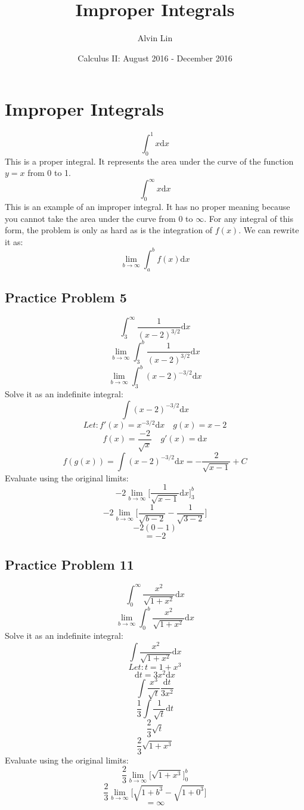 \documentclass[letterpaper, 12pt]{article}
\title{Improper Integrals}
\author{Alvin Lin}
\date{Calculus II: August 2016 - December 2016}
\newcommand*{\diff}{\mathrm{d}}
\begin{document}
\maketitle

\section*{Improper Integrals}
\[ \int_{0}^{1}x\diff{x} \]
This is a proper integral. It represents the area under the curve of the
function \( y=x \) from 0 to 1.
\[ \int_{0}^{\infty}{x\diff{x}} \]
This is an example of an improper integral. It has no proper meaning because
you cannot take the area under the curve from 0 to \(\infty\). For any integral
of this form, the problem is only as hard as is the integration of \(f(x)\). We
can rewrite it as:
\[ \lim_{b \to \infty}\int_{a}^{b}{f(x)\diff{x}} \]

\subsection*{Practice Problem 5}
\[ \int_{3}^{\infty}{\frac{1}{(x-2)^{3/2}}\diff{x}} \]
\[ \lim_{b \to \infty}\int_{3}^{b}{\frac{1}{(x-2)^{3/2}}\diff{x}} \]
\[ \lim_{b \to \infty}\int_{3}^{b}{(x-2)^{-3/2}\diff{x}} \]
Solve it as an indefinite integral:
\[ \int{(x-2)^{-3/2}\diff{x}} \]
\[ Let: f'(x) = x^{-3/2}\diff{x} \quad g(x) = x-2 \]
\[ f(x) = \frac{-2}{\sqrt{x}} \quad g'(x) = \diff{x} \]
\[ f(g(x)) = \int{(x-2)^{-3/2}\diff{x}} = -\frac{2}{\sqrt{x-1}}+C \]
Evaluate using the original limits:
\[ -2\lim_{b \to \infty}\bigg[\frac{1}{\sqrt{x-1}}\diff{x}\bigg]_{3}^{b} \]
\[ -2\lim_{b \to \infty}
   \bigg[\frac{1}{\sqrt{b-2}}-\frac{1}{\sqrt{3-2}}\bigg] \]
\[ -2(0-1) \]
\[ = -2 \]

\subsection*{Practice Problem 11}
\[ \int_{0}^{\infty}{\frac{x^{2}}{\sqrt{1+x^{2}}}\diff{x}} \]
\[ \lim_{b \to \infty}\int_{0}^{b}{\frac{x^{2}}{\sqrt{1+x^{2}}}\diff{x}} \]
Solve it as an indefinite integral:
\[ \int{\frac{x^{2}}{\sqrt{1+x^{2}}}\diff{x}} \]
\[ Let: t = 1+x^{3} \]
\[ \diff{t} = 3x^{2}\diff{x} \]
\[ \int{\frac{x^{3}}{\sqrt{t}}\frac{\diff{t}}{3x^{2}}} \]
\[ \frac{1}{3}\int{\frac{1}{\sqrt{t}}\diff{t}} \]
\[ \frac{2}{3}\sqrt{t} \]
\[ \frac{2}{3}\sqrt{1+x^{3}} \]
Evaluate using the original limits:
\[ \frac{2}{3}\lim_{b \to \infty}\bigg[\sqrt{1+x^{3}}\bigg]_{0}^{b} \]
\[ \frac{2}{3}\lim_{b \to \infty}\bigg[\sqrt{1+b^{3}}-\sqrt{1+0^{3}}\bigg] \]
\[ = \infty \]
\end{document}

